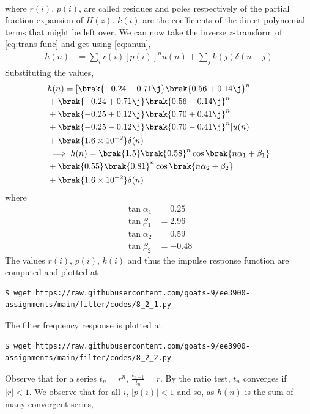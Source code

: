 \documentclass[journal,12pt,twocolumn]{IEEEtran}
\renewcommand\thesection{\arabic{section}}
\begin{document}
\begin{enumerate}[label=\thesection.\arabic*.,ref=\thesection.\theenumi]
\begin{align}
	\label{eq:trans-func}
\end{align}
where $r(i)$, $p(i)$, are called residues and poles respectively of the partial 
fraction expansion of $H(z)$. $k(i)$ are the coefficients of the direct polynomial 
terms that might be left over. We can now take the inverse $z$-transform of
\eqref{eq:trans-func} and get using \eqref{eq:anun},
\begin{align}
	h(n) &= \sum_{i}r(i)[p(i)]^nu(n) + \sum_{j}k(j)\delta(n - j)
	\label{eq:h-n-expr}
\end{align}
Substituting the values,
\begin{align}
	&h(n) = [\brak{-0.24-0.71\j}\brak{0.56+0.14\j}^n \nonumber \\
	&+ \brak{-0.24+0.71\j}\brak{0.56-0.14\j}^n \nonumber \\
	&+ \brak{-0.25+0.12\j}\brak{0.70+0.41\j}^n \nonumber \\
	&+ \brak{-0.25-0.12\j}\brak{0.70-0.41\j}^n]u(n) \nonumber \\
	&+ \brak{1.6 \times 10^{-2}}\delta(n) \\
	&\implies h(n) = \brak{1.5}\brak{0.58}^n\cos\brak{n\alpha_1 + \beta_1} \nonumber \\
	&+ \brak{0.55}\brak{0.81}^n\cos\brak{n\alpha_2 + \beta_2} \nonumber \\
	&+ \brak{1.6 \times 10^{-2}}\delta(n)
	\label{eq:h-n-real}
\end{align}
where
\begin{align}
	\tan{\alpha_1} &= 0.25 \\
	\tan{\beta_1} &= 2.96 \\
	\tan{\alpha_2} &= 0.59 \\
	\tan{\beta_2} &= -0.48
	\label{eq:h-params}
\end{align}
The values $r(i)$, $p(i)$, $k(i)$ and thus the impulse response function are computed and plotted at
\begin{lstlisting}
$ wget https://raw.githubusercontent.com/goats-9/ee3900-assignments/main/filter/codes/8_2_1.py
\end{lstlisting}
The filter frequency response is plotted at
\begin{lstlisting}
$ wget https://raw.githubusercontent.com/goats-9/ee3900-assignments/main/filter/codes/8_2_2.py
\end{lstlisting}
Observe that for a series $t_n = r^n$, $\frac{t_{n + 1}}{t_n} = r$.
By the ratio test, $t_n$ converges if $|r| < 1$. We observe that for all $i$, 
$|p(i)| < 1$ and so, as $h(n)$ is the sum of many convergent series,

\end{enumerate}
\end{document}
